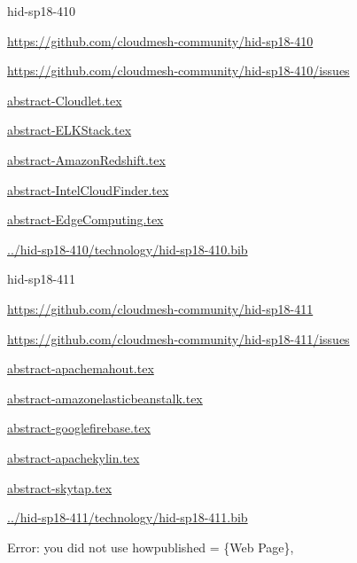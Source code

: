 \begin{IU}

hid-sp18-410

\url{https://github.com/cloudmesh-community/hid-sp18-410}

\url{https://github.com/cloudmesh-community/hid-sp18-410/issues}

\href{https://github.com/cloudmesh-community/hid-sp18-410/blob/master//technology/abstract-Cloudlet.tex}{abstract-Cloudlet.tex}

\href{https://github.com/cloudmesh-community/hid-sp18-410/blob/master//technology/abstract-ELKStack.tex}{abstract-ELKStack.tex}

\href{https://github.com/cloudmesh-community/hid-sp18-410/blob/master//technology/abstract-AmazonRedshift.tex}{abstract-AmazonRedshift.tex}

\href{https://github.com/cloudmesh-community/hid-sp18-410/blob/master//technology/abstract-IntelCloudFinder.tex}{abstract-IntelCloudFinder.tex}

\href{https://github.com/cloudmesh-community/hid-sp18-410/blob/master//technology/abstract-EdgeComputing.tex}{abstract-EdgeComputing.tex}

\href{https://github.com/cloudmesh-community/hid-sp18-410/blob/master//technology/hid-sp18-410.bib}{../hid-sp18-410/technology/hid-sp18-410.bib}

\end{IU}


\begin{IU}

hid-sp18-411

\url{https://github.com/cloudmesh-community/hid-sp18-411}

\url{https://github.com/cloudmesh-community/hid-sp18-411/issues}

\href{https://github.com/cloudmesh-community/hid-sp18-411/blob/master//technology/abstract-apachemahout.tex}{abstract-apachemahout.tex}

\href{https://github.com/cloudmesh-community/hid-sp18-411/blob/master//technology/abstract-amazonelasticbeanstalk.tex}{abstract-amazonelasticbeanstalk.tex}

\href{https://github.com/cloudmesh-community/hid-sp18-411/blob/master//technology/abstract-googlefirebase.tex}{abstract-googlefirebase.tex}

\href{https://github.com/cloudmesh-community/hid-sp18-411/blob/master//technology/abstract-apachekylin.tex}{abstract-apachekylin.tex}

\href{https://github.com/cloudmesh-community/hid-sp18-411/blob/master//technology/abstract-skytap.tex}{abstract-skytap.tex}

\href{https://github.com/cloudmesh-community/hid-sp18-411/blob/master//technology/hid-sp18-411.bib}{../hid-sp18-411/technology/hid-sp18-411.bib}

Error: you did not use howpublished = \{Web Page\},

\end{IU}


